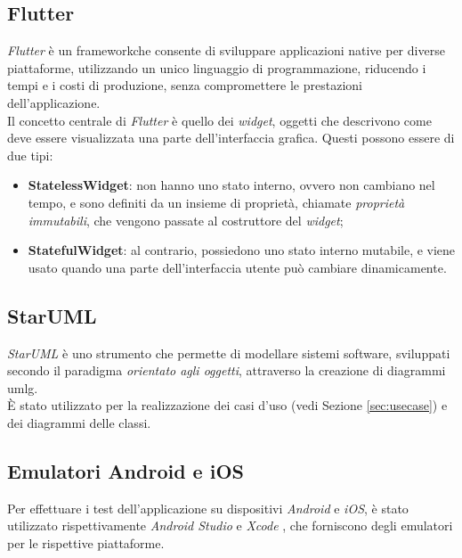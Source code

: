 \subsection*{Flutter}
\label{subsec:flutter}

\emph{Flutter} \cite{site:flutter} è un \gls{framework}\glsoccur che consente di sviluppare applicazioni native per diverse piattaforme, utilizzando un unico linguaggio di programmazione, riducendo i tempi e i costi di produzione, senza compromettere le prestazioni dell'applicazione.\\
Il concetto centrale di \emph{Flutter} è quello dei \emph{widget}, oggetti che descrivono come deve essere visualizzata una parte dell'interfaccia grafica. Questi possono essere di due tipi:
\begin{itemize}
    \item \textbf{StatelessWidget}: non hanno uno stato interno, ovvero non cambiano nel tempo, e sono definiti da un insieme di proprietà, chiamate \emph{proprietà immutabili}, che vengono passate al costruttore del \emph{widget};
    \item \textbf{StatefulWidget}: al contrario, possiedono uno stato interno mutabile, e viene usato quando una parte dell'interfaccia utente può cambiare dinamicamente.
\end{itemize}

\subsection*{StarUML}
\label{subsec:staruml}

\emph{StarUML} \cite{site:staruml} è uno strumento che permette di modellare sistemi software, sviluppati secondo il paradigma \emph{orientato agli oggetti}, attraverso la creazione di diagrammi \gls{umlg}\glsoccur.\\
È stato utilizzato per la realizzazione dei casi d'uso (vedi Sezione \ref{sec:usecase}) e dei diagrammi delle classi.

\subsection*{Emulatori Android e iOS}
\label{subsec:emulatori}

Per effettuare i test dell'applicazione su dispositivi \emph{Android} e \emph{iOS}, è stato utilizzato rispettivamente \emph{Android Studio} \cite{site:android-studio} e \emph{Xcode} \cite{site:xcode}, che forniscono degli emulatori per le rispettive piattaforme.\\

